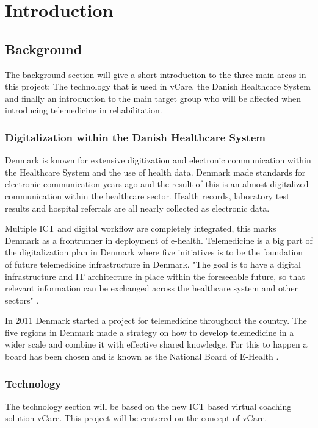 \chapter{Introduction}

\section{Background}
The background section will give a short introduction to the three main areas in this project; The technology that is used in vCare, the Danish Healthcare System and finally an introduction to the main target group who will be affected when introducing telemedicine in rehabilitation. 

\subsection{Digitalization within the Danish Healthcare System}

Denmark is known for extensive digitization and electronic communication within the Healthcare System and the use of health data. Denmark made standards for electronic communication years ago and the result of this is an almost digitalized communication within the healthcare sector. Health records, laboratory test results and hospital referrals are all nearly collected as electronic data. 

Multiple ICT and digital workflow are completely integrated, this marks Denmark as a frontrunner in deployment of e-health. Telemedicine is a big part of the digitalization plan in Denmark where five initiatives is to be the foundation of future telemedicine infrastructure in Denmark. "The goal is to have a digital infrastructure and IT architecture in place within the foreseeable future, so that relevant information can be exchanged across the healthcare system and other sectors" \cite{Healthcareindk2}.

In 2011 Denmark started a project for telemedicine throughout the country. The five regions in Denmark made a strategy on how to develop telemedicine in a wider scale and combine it with effective shared knowledge. For this to happen a board has been chosen and is known as the National Board of E-Health \cite{DKhealthreview}. 

\subsection{Technology}

The technology section will be based on the new ICT based virtual coaching solution vCare. This project will be centered on the concept of vCare.

